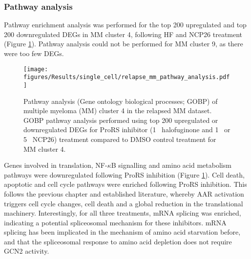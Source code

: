 \subsubsection{Pathway analysis}
Pathway enrichment analysis was performed for the top 200 upregulated and top 200 downregulated DEGs in MM cluster 4, following HF and NCP26 treatment (Figure \ref{fig:relapse_mm_pathway_analysis}).
Pathway analysis could not be performed for MM cluster 9, as there were too few DEGs.
\begin{figure}[htb]
\centering
\texttt{[image: figures/Results/single\_cell/relapse\_mm\_pathway\_analysis.pdf]}
\caption[MM cluster pathway analysis- relapsed MM]{Pathway analysis (Gene ontology biological processes; GOBP) of multiple myeloma (MM) cluster 4 in the relapsed MM dataset.
GOBP pathway analysis performed using top 200 upregulated or downregulated DEGs for ProRS inhibitor (1\si{\micro\Molar} halofuginone and 1\si{\micro\Molar} or 5\si{\micro\Molar}  NCP26) treatment compared to DMSO control treatment for MM cluster 4.
}
\label{fig:relapse_mm_pathway_analysis}
\end{figure}
Genes involved in translation, NF-$\kappa$B signalling and amino acid metabolism pathways were downregulated following ProRS inhibition (Figure \ref{fig:relapse_mm_pathway_analysis}).
Cell death, apoptotic and cell cycle pathways were enriched following ProRS inhibition.
This follows the previous chapter and established literature, whereby AAR activation triggers cell cycle changes, cell death and a global reduction in the translational machinery.
Interestingly, for all three treatments, mRNA splicing was enriched, indicating a potential spliceosomal mechanism for these inhibitors.
mRNA splicing has been implicated in the mechanism of amino acid starvation before\cite{deval2009amino}, and that the spliceosomal response to amino acid depletion does not require GCN2 activity.

